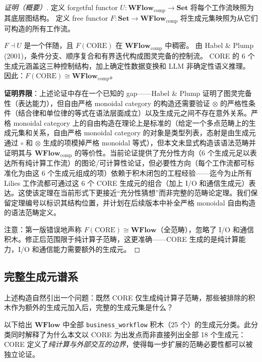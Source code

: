 \documentclass[11pt,a4paper]{article}
\theoremstyle{definition}
\theoremstyle{definition}
\theoremstyle{remark}
\newcommand{\cat}[1]{\mathbf{#1}}
\newcommand{\catWFlow}{\cat{WFlow}}
\newcommand{\catSet}{\cat{Set}}
\newcommand{\functor}[3]{#1: #2 \to #3}
\newcommand{\adjunction}{\dashv}
\newcommand{\tensor}{\otimes}
\begin{document}
\begin{proof}[证明（概要）]
定义 forgetful functor $\functor{U}{\catWFlow_{\mathrm{comp}}}{\catSet}$ 将每个工作流映照为其底层图结构。
定义 free functor $\functor{F}{\catSet}{\catWFlow_{\mathrm{comp}}}$ 将生成元集映照为从它们可构造的所有工作流。

$F \adjunction U$ 是一个伴随，且 $F(\mathrm{CORE})$ 在 $\catWFlow_{\mathrm{comp}}$ 中稠密。
由 Habel \& Plump (2001)，条件分支、顺序复合和有界迭代构成图灵完备的控制流。
CORE 的 6 个生成元涵盖这三种控制结构，加上确定性数据变换和 LLM 非确定性语义推理。
因此：$F(\mathrm{CORE}) \cong \catWFlow_{\mathrm{comp}}$。

\textbf{证明界限}：上述论证中存在一个已知的 gap——Habel \& Plump 证明了图灵完备性（表达能力），但自由严格 monoidal category 的构造还需要验证 $\tensor$ 的严格性条件（结合律和单位律的等式在语法层面成立）以及生成元之间不存在意外关系。严格 monoidal category 上的自由构造在理论上是标准的（给定一个多点范畴上的生成元集和关系，自由严格 monoidal category 的对象是类型列表，态射是由生成元通过 $\circ$ 和 $\tensor$ 生成的项模掉严格 monoidal 等式），但本文未显式构造该语法范畴并证明其与 $\catWFlow_{\mathrm{comp}}$ 的等价性。当前论证提供了充分性方向（6 个生成元足以表达所有纯计算工作流）的图论/可计算性论证，但必要性方向（每个工作流都可标准化为由这 6 个生成元组成的项）依赖于积木闭包的工程经验——迄今为止所有 Lilies 工作流都可通过这 6 个 CORE 生成元的组合（加上 I/O 和通信生成元）表达。这使该定理在当前形式下更接近``充分性猜想''而非完整的范畴论定理。我们保留定理编号以标识其结构位置，并计划在后续版本中补全严格 monoidal 自由构造的语法范畴定义。

注意：第一版错误地声称 $F(\mathrm{CORE}) \cong \catWFlow$（全范畴），忽略了 I/O 和通信积木。修正后范围限于纯计算子范畴，这更准确——CORE 生成的是纯计算能力，I/O 和通信能力需要额外的生成元。
\end{proof}

\subsection{完整生成元谱系}

上述构造自然引出一个问题：既然 CORE 仅生成纯计算子范畴，那些被排除的积木作为额外的生成元加入后，完整的生成元集是什么？

以下给出 $\catWFlow$ 中全部 \texttt{business\_workflow} 积木（25 个）的生成元分类。此分类同时解释了为什么本文以 CORE 为出发点而非直接列出全部 18 个生成元：CORE 定义了\emph{纯计算与外部交互的边界}，使得每一步扩展的范畴必要性都可以被独立论证。
\end{document}

